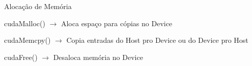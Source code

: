\begin{frame}[t]{Alocação de Memória}
    \Large{
    \begin{shaded}
        \itemize
        \item cudaMalloc() $\rightarrow$ Aloca espaço para cópias no Device\\
        \item cudaMemcpy() $\rightarrow$ Copia entradas do Host pro Device ou do Device pro Host\\
        \item cudaFree() $\rightarrow$ Desaloca memória no Device\\
    \end{shaded}
    }
    
\end{frame}
